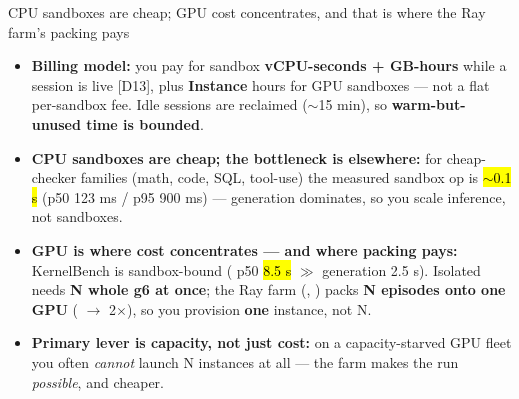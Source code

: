 \begin{frame}{CPU sandboxes are cheap; GPU cost concentrates, and that is where the Ray farm's packing pays}
\begin{itemize}\footnotesize\setlength{\itemsep}{2mm}
\item \textbf{Billing model:} you pay for sandbox \textbf{vCPU-seconds + GB-hours} while a session is live [D13], plus \textbf{Instance} hours for GPU sandboxes --- not a flat per-sandbox fee. Idle sessions are reclaimed ($\sim$15 min), so \textbf{warm-but-unused time is bounded}.
\item \textbf{CPU sandboxes are cheap; the bottleneck is elsewhere:} for cheap-checker families (math, code, SQL, tool-use) the measured sandbox op is \hl{$\sim$0.1 s} (p50 123 ms / p95 900 ms) --- generation dominates, so you scale inference, not sandboxes.
\item \textbf{GPU is where cost concentrates --- and where packing pays:} KernelBench is sandbox-bound ( p50 \hl{8.5 s} $\gg$ generation 2.5 s). Isolated needs \textbf{N whole g6 at once}; the Ray farm (, ) packs \textbf{N episodes onto one GPU} ( $\rightarrow$ 2$\times$), so you provision \textbf{one} instance, not N.
\item \textbf{Primary lever is capacity, not just cost:} on a capacity-starved GPU fleet you often \emph{cannot} launch N instances at all --- the farm makes the run \emph{possible}, and cheaper.
\end{itemize}
\end{frame}


